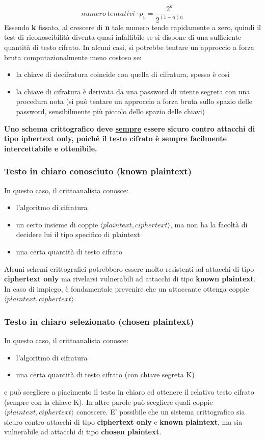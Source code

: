 \begin{equation}
numero \: tentativi  \cdot p_{v} = \frac{2^k}{2^{(1 - \alpha)n}}
\end{equation}
Essendo \textbf{k} fissato, al crescere di \textbf{n} tale numero tende rapidamente a zero, quindi il test di riconoscibilità diventa quasi infallibile se si dispone di una sufficiente quantità di testo cifrato. In alcuni casi, si potrebbe tentare un approccio a forza bruta computazionalmente meno costoso se:
\begin{itemize} 
  \item la chiave di decifratura coincide con quella di cifratura, spesso è così
  \item la chiave di cifratura è derivata da una password di utente segreta con una procedura nota (si può tentare un approccio a forza bruta sullo spazio delle password, sensibilmente più piccolo dello spazio delle chiavi)
\end{itemize}
\textbf{Uno schema crittografico deve \underline{sempre} essere sicuro contro attacchi di tipo iphertext only, poiché il testo cifrato è sempre facilmente intercettabile e ottenibile.}

\subsubsection{Testo in chiaro conosciuto (known plaintext)}
In questo caso, il crittoanalista conosce:
\begin{itemize} 
  \item l’algoritmo di cifratura
  \item un certo insieme di coppie $\langle plaintext, ciphertext \rangle$, ma non ha la facoltà di decidere lui il tipo specifico di plaintext
  \item una certa quantità di testo cifrato
\end{itemize}
Alcuni schemi crittografici potrebbero essere molto resistenti ad attacchi di tipo \textbf{ciphertext only} ma rivelarsi vulnerabili ad attacchi di tipo \textbf{known plaintext}. In caso di impiego, è fondamentale prevenire che un attaccante ottenga coppie $\langle plaintext, ciphertext \rangle$.

\subsubsection{Testo in chiaro selezionato (chosen plaintext)}
In questo caso, il crittoanalista conosce:
\begin{itemize} 
  \item l’algoritmo di cifratura
  \item una certa quantità di testo cifrato (con chiave segreta K)
\end{itemize}
e può scegliere a piacimento il testo in chiaro ed ottenere il relativo testo cifrato (sempre con la chiave K). In altre parole può scegliere quali coppie $\langle plaintext, ciphertext \rangle$ conoscere. E' possibile che un sistema crittografico sia sicuro contro attacchi di tipo \textbf{ciphertext only} e \textbf{known plaintext}, ma sia vulnerabile ad attacchi di tipo \textbf{chosen plaintext}.

